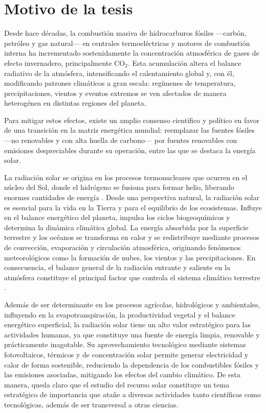 \section{Motivo de la tesis}
Desde hace décadas, la combustión masiva de hidrocarburos fósiles ---carbón, petróleo y gas natural--- en centrales termoeléctricas y motores de combustión interna ha incrementado sostenidamente la concentración atmosférica de gases de efecto invernadero, principalmente CO$_2$. Esta acumulación altera el balance radiativo de la atmósfera, intensificando el 
calentamiento global y, con él, modificando patrones climáticos a gran escala: regímenes de temperatura, precipitaciones, vientos y eventos extremos se ven afectados de manera heterogénea en distintas regiones del planeta.

Para mitigar estos efectos, existe un amplio consenso científico y político en favor de una transición en la matriz energética mundial: reemplazar las fuentes fósiles ---no renovables y con alta huella de carbono--- por fuentes renovables con emisiones despreciables durante 
su operación, entre las que se destaca la energía solar.

La radiación solar se origina en los procesos termonucleares que ocurren en el núcleo del Sol, donde el hidrógeno se fusiona para formar helio, liberando enormes cantidades de energía \citep{Wald2021}. Desde una perspectiva natural, la radiación solar es esencial para la vida en la Tierra y para el equilibrio de los ecosistemas. Influye en el balance energético del planeta, impulsa los ciclos biogeoquímicos y determina la dinámica climática global. La energía absorbida por la superficie terrestre y los océanos se transforma en calor y se redistribuye mediante procesos de convección, evaporación y circulación atmosférica, originando fenómenos meteorológicos como la formación de nubes, los vientos y las precipitaciones. En consecuencia, el balance general de la radiación entrante y saliente en la atmósfera constituye el principal factor que controla el sistema climático terrestre \citep{TrenberthStepaniak2004, Haigh2015, Gray2010}.

Además de ser determinante en los procesos agrícolas, hidrológicos y ambientales, influyendo en la evapotranspiración, la productividad vegetal y el balance energético superficial, la radiación solar tiene un alto valor estratégico para las actividades humanas, ya que constituye una fuente de energía limpia, renovable y prácticamente inagotable. Su aprovechamiento tecnológico mediante sistemas fotovoltaicos, térmicos y de concentración solar permite generar electricidad y calor de forma sostenible, reduciendo la dependencia de los combustibles fósiles y las emisiones asociadas, mitigando los efectos del cambio climático. De esta manera, queda claro que el estudio del recurso solar constituye un tema estratégico de importancia que atañe a diversas actividades tanto científicas como tecnológicas, además de ser transversal a otras ciencias.

